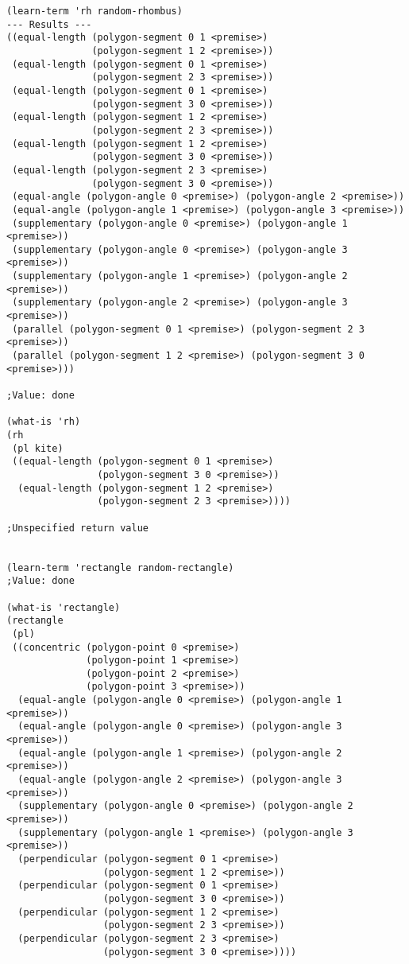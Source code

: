 \begin{verbatim}
(learn-term 'rh random-rhombus)
--- Results ---
((equal-length (polygon-segment 0 1 <premise>)
               (polygon-segment 1 2 <premise>))
 (equal-length (polygon-segment 0 1 <premise>)
               (polygon-segment 2 3 <premise>))
 (equal-length (polygon-segment 0 1 <premise>)
               (polygon-segment 3 0 <premise>))
 (equal-length (polygon-segment 1 2 <premise>)
               (polygon-segment 2 3 <premise>))
 (equal-length (polygon-segment 1 2 <premise>)
               (polygon-segment 3 0 <premise>))
 (equal-length (polygon-segment 2 3 <premise>)
               (polygon-segment 3 0 <premise>))
 (equal-angle (polygon-angle 0 <premise>) (polygon-angle 2 <premise>))
 (equal-angle (polygon-angle 1 <premise>) (polygon-angle 3 <premise>))
 (supplementary (polygon-angle 0 <premise>) (polygon-angle 1 <premise>))
 (supplementary (polygon-angle 0 <premise>) (polygon-angle 3 <premise>))
 (supplementary (polygon-angle 1 <premise>) (polygon-angle 2 <premise>))
 (supplementary (polygon-angle 2 <premise>) (polygon-angle 3 <premise>))
 (parallel (polygon-segment 0 1 <premise>) (polygon-segment 2 3 <premise>))
 (parallel (polygon-segment 1 2 <premise>) (polygon-segment 3 0 <premise>)))

;Value: done

(what-is 'rh)
(rh
 (pl kite)
 ((equal-length (polygon-segment 0 1 <premise>)
                (polygon-segment 3 0 <premise>))
  (equal-length (polygon-segment 1 2 <premise>)
                (polygon-segment 2 3 <premise>))))

;Unspecified return value


(learn-term 'rectangle random-rectangle)
;Value: done

(what-is 'rectangle)
(rectangle
 (pl)
 ((concentric (polygon-point 0 <premise>)
              (polygon-point 1 <premise>)
              (polygon-point 2 <premise>)
              (polygon-point 3 <premise>))
  (equal-angle (polygon-angle 0 <premise>) (polygon-angle 1 <premise>))
  (equal-angle (polygon-angle 0 <premise>) (polygon-angle 3 <premise>))
  (equal-angle (polygon-angle 1 <premise>) (polygon-angle 2 <premise>))
  (equal-angle (polygon-angle 2 <premise>) (polygon-angle 3 <premise>))
  (supplementary (polygon-angle 0 <premise>) (polygon-angle 2 <premise>))
  (supplementary (polygon-angle 1 <premise>) (polygon-angle 3 <premise>))
  (perpendicular (polygon-segment 0 1 <premise>)
                 (polygon-segment 1 2 <premise>))
  (perpendicular (polygon-segment 0 1 <premise>)
                 (polygon-segment 3 0 <premise>))
  (perpendicular (polygon-segment 1 2 <premise>)
                 (polygon-segment 2 3 <premise>))
  (perpendicular (polygon-segment 2 3 <premise>)
                 (polygon-segment 3 0 <premise>))))


\end{verbatim}
